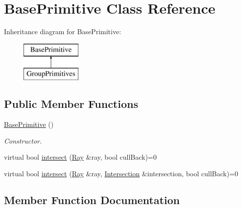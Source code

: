 \hypertarget{class_base_primitive}{}\section{Base\+Primitive Class Reference}
\label{class_base_primitive}
Inheritance diagram for Base\+Primitive\+:\begin{figure}[H]
\begin{center}
\leavevmode
\includegraphics[height=2.000000cm]{class_base_primitive}
\end{center}
\end{figure}
\subsection*{Public Member Functions}
\begin{DoxyCompactItemize}
\item 
\mbox{\label{class_base_primitive_a06a4cf2f143fc0eb478d3ab97b53c536}} 
\mbox{\hyperlink{class_base_primitive_a06a4cf2f143fc0eb478d3ab97b53c536}{Base\+Primitive}} ()
\begin{DoxyCompactList}\small\item\em Constructor. \end{DoxyCompactList}\item 
virtual bool \mbox{\hyperlink{class_base_primitive_a608aa970836909d21c0413d894612eca}{intersect}} (\mbox{\hyperlink{class_ray}{Ray}} \&ray, bool cull\+Back)=0
\item 
virtual bool \mbox{\hyperlink{class_base_primitive_a1f9cb5f2c71f2e1f985513a154f22712}{intersect}} (\mbox{\hyperlink{class_ray}{Ray}} \&ray, \mbox{\hyperlink{class_intersection}{Intersection}} \&intersection, bool cull\+Back)=0
\end{DoxyCompactItemize}


\subsection{Member Function Documentation}
\mbox{\label{class_base_primitive_a608aa970836909d21c0413d894612eca}} 
